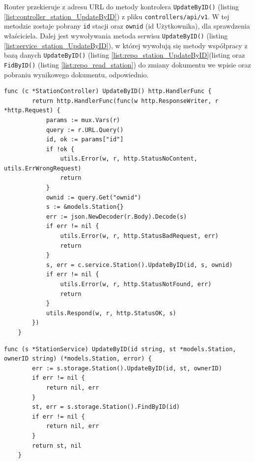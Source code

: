 Router przekieruje z adresu URL do metody kontrolera \texttt{UpdateByID()} (listing \ref{list:controller_station_UpdateByID}) z pliku \texttt{controllers/api/v1}. W tej metodzie zostaje pobrany \texttt{id} stacji oraz \texttt{ownid} (id Użytkownika), dla sprawdzenia właściciela.
Dalej jest wywoływania metoda serwisu \texttt{UpdateByID()} (listing \ref{list:service_station_UpdateByID}), w której wywołują się metody współpracy z bazą danych \texttt{UpdateByID()} (listing \ref{list:repo_station_UpdateByID}(listing  oraz \texttt{FidByID()} (listing \ref{list:repo_read_station}) do zmiany dokumentu we wpisie oraz pobraniu wynikowego dokumentu, odpowiednio.
\begin{lstlisting}[label=list:controller_station_UpdateByID,caption=Kontroler edycji stacji ładowniczej,basicstyle=\tiny\ttfamily]
    func (c *StationController) UpdateByID() http.HandlerFunc {
        return http.HandlerFunc(func(w http.ResponseWriter, r *http.Request) {
            params := mux.Vars(r)
            query := r.URL.Query()
            id, ok := params["id"]
            if !ok {
                utils.Error(w, r, http.StatusNoContent, utils.ErrWrongRequest)
                return
            }
            ownid := query.Get("ownid")
            s := &models.Station{}
            err := json.NewDecoder(r.Body).Decode(s)
            if err != nil {
                utils.Error(w, r, http.StatusBadRequest, err)
                return
            }
            s, err = c.service.Station().UpdateByID(id, s, ownid)
            if err != nil {
                utils.Error(w, r, http.StatusNotFound, err)
                return
            }
            utils.Respond(w, r, http.StatusOK, s)
        })
    }
\end{lstlisting}
\begin{lstlisting}[label=list:service_station_UpdateByID,caption=Serwis edycji stacji ładowniczej,basicstyle=\tiny\ttfamily]
    func (s *StationService) UpdateByID(id string, st *models.Station, ownerID string) (*models.Station, error) {
        err := s.storage.Station().UpdateByID(id, st, ownerID)
        if err != nil {
            return nil, err
        }
        st, err = s.storage.Station().FindByID(id)
        if err != nil {
            return nil, err
        }
        return st, nil
    }
\end{lstlisting}
